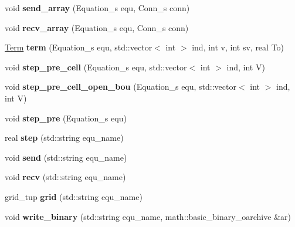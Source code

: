 \begin{DoxyCompactItemize}
\item 
\hypertarget{classFace_afdbbc9947c0d7cd84b427bd7b503b15b}{void {\bfseries send\+\_\+array} (Equation\+\_\+s equ, Conn\+\_\+s conn)}\label{classFace_afdbbc9947c0d7cd84b427bd7b503b15b}

\item 
\hypertarget{classFace_a57bdfcf1ebf5e208b611f98b7ddeca00}{void {\bfseries recv\+\_\+array} (Equation\+\_\+s equ, Conn\+\_\+s conn)}\label{classFace_a57bdfcf1ebf5e208b611f98b7ddeca00}

\item 
\hypertarget{classFace_aa827a7d26d1b90507bb4252830b3ecf5}{\hyperlink{structTerm}{Term} {\bfseries term} (Equation\+\_\+s equ, std\+::vector$<$ int $>$ ind, int v, int sv, real To)}\label{classFace_aa827a7d26d1b90507bb4252830b3ecf5}

\item 
\hypertarget{classFace_aba0d776b0f0e7cceee8729825347b5cc}{void {\bfseries step\+\_\+pre\+\_\+cell} (Equation\+\_\+s equ, std\+::vector$<$ int $>$ ind, int V)}\label{classFace_aba0d776b0f0e7cceee8729825347b5cc}

\item 
\hypertarget{classFace_a2bafbcce9f57fd3bdefd9f23a62c853d}{void {\bfseries step\+\_\+pre\+\_\+cell\+\_\+open\+\_\+bou} (Equation\+\_\+s equ, std\+::vector$<$ int $>$ ind, int V)}\label{classFace_a2bafbcce9f57fd3bdefd9f23a62c853d}

\item 
\hypertarget{classFace_a8af2298846b8a666332f00de91796844}{void {\bfseries step\+\_\+pre} (Equation\+\_\+s equ)}\label{classFace_a8af2298846b8a666332f00de91796844}

\item 
\hypertarget{classFace_a62a7d504c1e99dfc928b7e27b544893b}{real {\bfseries step} (std\+::string equ\+\_\+name)}\label{classFace_a62a7d504c1e99dfc928b7e27b544893b}

\item 
\hypertarget{classFace_a781b3843f33507116afa741579317e83}{void {\bfseries send} (std\+::string equ\+\_\+name)}\label{classFace_a781b3843f33507116afa741579317e83}

\item 
\hypertarget{classFace_a4c67c45fa975e6fb3bc3d4ee0fa6a25f}{void {\bfseries recv} (std\+::string equ\+\_\+name)}\label{classFace_a4c67c45fa975e6fb3bc3d4ee0fa6a25f}

\item 
\hypertarget{classFace_a18aba75abf718dd35c17153220ad929b}{grid\+\_\+tup {\bfseries grid} (std\+::string equ\+\_\+name)}\label{classFace_a18aba75abf718dd35c17153220ad929b}

\item 
\hypertarget{classFace_aa79a5f4cab8cc5bfb2c35923aa488cb7}{void {\bfseries write\+\_\+binary} (std\+::string equ\+\_\+name, math\+::basic\+\_\+binary\+\_\+oarchive \&ar)}\label{classFace_aa79a5f4cab8cc5bfb2c35923aa488cb7}

\end{DoxyCompactItemize}
